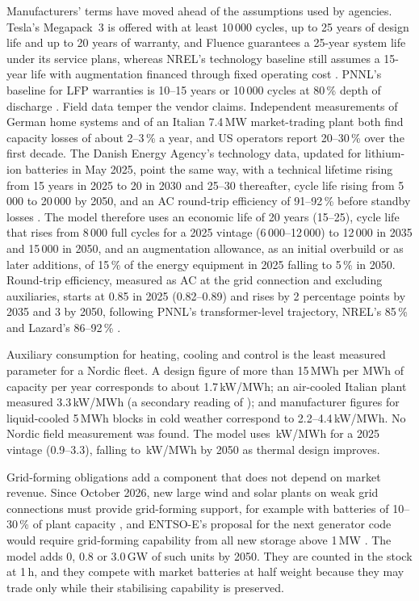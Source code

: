 \documentclass[11pt]{article}
\begin{document}
Manufacturers' terms have moved ahead of the assumptions used by agencies.
Tesla's Megapack~3 is offered with at least 10\,000 cycles, up to 25 years of design life and up to 20 years of warranty, and Fluence guarantees a 25-year system life under its service plans, whereas NREL's technology baseline still assumes a 15-year life with augmentation financed through fixed operating cost \citep{nrel2025batterycost}. PNNL's baseline for LFP warranties is 10--15 years or 10\,000 cycles at 80\,\% depth of discharge \citep{viswanathan2022pnnl}.
Field data temper the vendor claims. Independent measurements of German home systems and of an Italian 7.4\,MW market-trading plant both find capacity losses of about 2--3\,\% a year, and US operators report 20--30\,\% over the first decade.
The Danish Energy Agency's technology data, updated for lithium-ion batteries in May 2025, point the same way, with a technical lifetime rising from 15 years in 2025 to 20 in 2030 and 25--30 thereafter, cycle life rising from 5\,000 to 20\,000 by 2050, and an AC round-trip efficiency of 91--92\,\% before standby losses \citep{dea2025techdata}.
The model therefore uses an economic life of 20 years (15--25), cycle life that rises from 8\,000 full cycles for a 2025 vintage (6\,000--12\,000) to 12\,000 in 2035 and 15\,000 in 2050, and an augmentation allowance, as an initial overbuild or as later additions, of 15\,\% of the energy equipment in 2025 falling to 5\,\% in 2050.
Round-trip efficiency, measured as AC at the grid connection and excluding auxiliaries, starts at 0.85 in 2025 (0.82--0.89) and rises by 2 percentage points by 2035 and 3 by 2050, following PNNL's transformer-level trajectory, NREL's 85\,\% and Lazard's 86--92\,\% \citep{viswanathan2022pnnl,nrel2025batterycost,lazard2026lcoe}.

Auxiliary consumption for heating, cooling and control is the least measured parameter for a Nordic fleet.
A design figure of more than 15\,MWh per MWh of capacity per year \citep{esn2026enertis} corresponds to about 1.7\,kW/MWh; an air-cooled Italian plant measured 3.3\,kW/MWh (a secondary reading of \citealt{dimovski2026aux}); and manufacturer figures for liquid-cooled 5\,MWh blocks in cold weather correspond to 2.2--4.4\,kW/MWh. No Nordic field measurement was found.
The model uses \,kW/MWh for a 2025 vintage (0.9--3.3), falling to \,kW/MWh by 2050 as thermal design improves.

Grid-forming obligations add a component that does not depend on market revenue.
Since October 2026, new large wind and solar plants on weak grid connections must provide grid-forming support, for example with batteries of 10--30\,\% of plant capacity \citep{essnews2026gridforming}, and ENTSO-E's proposal for the next generator code would require grid-forming capability from all new storage above 1\,MW \citep{essnews2025rfg}.
The model adds 0, 0.8 or 3.0\,GW of such units by 2050. They are counted in the stock at 1\,h, and they compete with market batteries at half weight because they may trade only while their stabilising capability is preserved.
\end{document}
